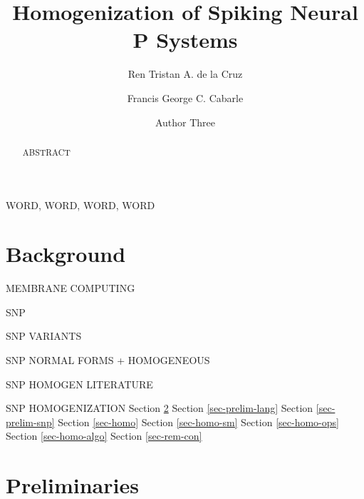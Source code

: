 \documentclass[]{elsarticle}
\theoremstyle{definition}
\theoremstyle{definition}
\begin{document}

\begin{frontmatter}

\title{Homogenization of Spiking Neural P Systems}

\author[1]{Ren Tristan A. de la Cruz}
\author[1]{Francis George C. Cabarle}
\author[2]{Author Three}

\address[1]
{
Algorithms and Complexity Lab, 
Department of Computer Science, 
University of the Philippines Diliman,
1101, Quezon City, Philippines.
}
\address[2]{(address 2)}


\begin{abstract}
ABSTRACT
\end{abstract}

\begin{keyword}
WORD, WORD, WORD, WORD
\end{keyword}

\end{frontmatter}


\section{Background}

MEMBRANE COMPUTING

SNP

\cite{ionescu-2006-snp}
\cite{chen-2008-snp-e}

SNP VARIANTS

SNP NORMAL FORMS + HOMOGENEOUS

SNP HOMOGEN LITERATURE

SNP HOMOGENIZATION
Section \ref{sec-prelim}
Section \ref{sec-prelim-lang}
Section \ref{sec-prelim-snp}
Section \ref{sec-homo}
Section \ref{sec-homo-sm}
Section \ref{sec-homo-ops}
Section \ref{sec-homo-algo}
Section \ref{sec-rem-con}

\section{Preliminaries} \label{sec-prelim}
\end{document}
